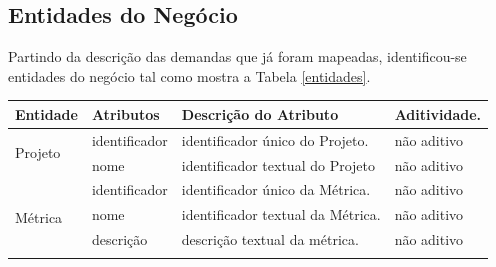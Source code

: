 \subsection{Entidades do Negócio}

Partindo da descrição das demandas que já foram mapeadas, identificou-se entidades do negócio tal como mostra a Tabela \ref{entidades}.


\begin{table}[h]
\centering
\begin{tabular}{|p{2cm}|p{2.5cm}|p{4cm}|p{2cm}|}
\hline
Entidade                   & Atributos                & Descrição do Atributo  & Aditividade.                 \\ \hline


\multirow{2}{*}{Projeto}   & identificador            & identificador único do Projeto.                                                                                                                                                                                                       & não aditivo                 \\ \cline{2-4} 
                           & nome                     & identificador textual do Projeto                                                                                                                                                                                                      & não aditivo                 \\ \hline
\multirow{4}{*}{Métrica}   & identificador            & identificador único da Métrica.                                                                                                                                                                                                       & não aditivo                 \\ \cline{2-4} 
                           & nome                     & identificador textual da Métrica.                                                                                                                                                                                                      & não aditivo                 \\ \cline{2-4} 
                           & descrição                & descrição textual da métrica.                                                                                                                                                                                                          & não aditivo                 \\ \cline{2-4} 

\end{tabular}
\end{table}
